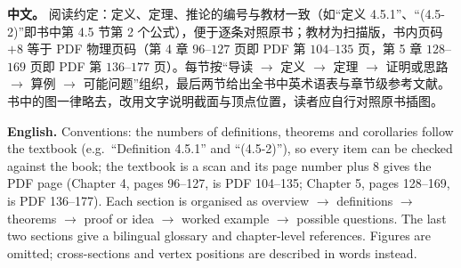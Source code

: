 \documentclass[UTF8,11pt,a4paper]{ctexart}
\newcommand{\APS}[2]{\par\noindent\textbf{中文。} #1\par\noindent\textbf{English.} #2\par\smallskip}
\theoremstyle{definition}
\begin{document}
\APS{阅读约定：定义、定理、推论的编号与教材一致（如``定义 4.5.1''、``(4.5-2)''即书中第 4.5 节第 2 个公式），便于逐条对照原书；教材为扫描版，书内页码 $+8$ 等于 PDF 物理页码（第 4 章 $96$--$127$ 页即 PDF 第 $104$--$135$ 页，第 5 章 $128$--$169$ 页即 PDF 第 $136$--$177$ 页）。每节按``导读 $\to$ 定义 $\to$ 定理 $\to$ 证明或思路 $\to$ 算例 $\to$ 可能问题''组织，最后两节给出全书中英术语表与章节级参考文献。书中的图一律略去，改用文字说明截面与顶点位置，读者应自行对照原书插图。}{Conventions: the numbers of definitions, theorems and corollaries follow the textbook (e.g.\ ``Definition 4.5.1'' and ``(4.5-2)''), so every item can be checked against the book; the textbook is a scan and its page number plus 8 gives the PDF page (Chapter 4, pages 96--127, is PDF 104--135; Chapter 5, pages 128--169, is PDF 136--177). Each section is organised as overview $\to$ definitions $\to$ theorems $\to$ proof or idea $\to$ worked example $\to$ possible questions. The last two sections give a bilingual glossary and chapter-level references. Figures are omitted; cross-sections and vertex positions are described in words instead.}
\end{document}
